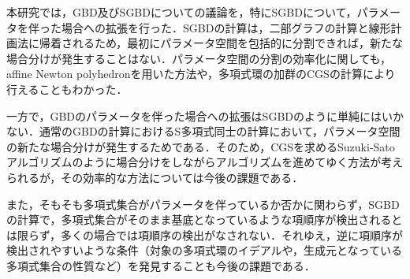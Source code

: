 本研究では，GBD及びSGBDについての議論を，特にSGBDについて，パラメータを伴った場合への拡張を行った．SGBDの計算は，二部グラフの計算と線形計画法に帰着されるため，最初にパラメータ空間を包括的に分割できれば，新たな場合分けが発生することはない．パラメータ空間の分割の効率化に関しても，affine Newton polyhedronを用いた方法や，多項式環の加群のCGSの計算により行えることもわかった．
\par
一方で，GBDのパラメータを伴った場合への拡張はSGBDのように単純にはいかない．通常のGBDの計算におけるS多項式同士の計算において，パラメータ空間の新たな場合分けが発生するためである．そのため，CGSを求めるSuzuki-Satoアルゴリズム\cite{suzuki2003alternative}のように場合分けをしながらアルゴリズムを進めてゆく方法が考えられるが，その効率的な方法については今後の課題である．
\par
また，そもそも多項式集合がパラメータを伴っているか否かに関わらず，SGBDの計算で，多項式集合がそのまま\groebner{}基底となっているような項順序が検出されるとは限らず，多くの場合では項順序の検出がなされない．それゆえ，逆に項順序が検出されやすいような条件（対象の多項式環のイデアルや，生成元となっている多項式集合の性質など）を発見することも今後の課題である．